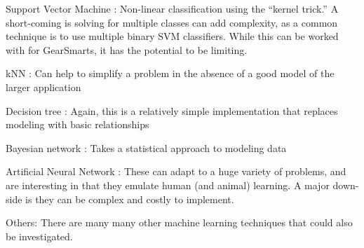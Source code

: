 \begin{description}
  \item{Support Vector Machine \cite{SVM}:} Non-linear classification using the ``kernel trick.'' A short-coming is solving for multiple
  classes can add complexity, as a common technique is to use multiple binary SVM classifiers. While this can be worked with
  for GearSmarts, it has the potential to be limiting.
  \item{kNN \cite{KNN}:} Can help to simplify a problem in the absence of a good model of the larger application
  \item{Decision tree \cite{DecisionTree}:} Again, this is a relatively simple implementation that replaces modeling with basic relationships
  \item{Bayesian network \cite{BayesianNetwork}:} Takes a statistical approach to modeling data
  \item{Artificial Neural Network \cite{ANN}:} These can adapt to a huge variety of problems, and are interesting in that they emulate
  human (and animal) learning. A major down-side is they can be complex and costly to implement.
  \item{Others:} There are many many other machine learning techniques that could also be investigated.
\end{description}